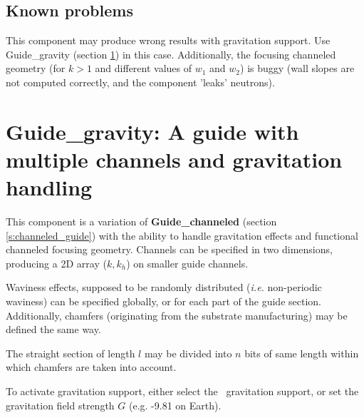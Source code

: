\subsection{Known problems}
This component may produce wrong results with gravitation support. Use Guide\_gravity (section \ref{s:guide_gravity}) in this case. 
Additionally, the focusing channeled geometry (for $k > 1$ and different
values of $w_1$ and $w_2$) is buggy 
(wall slopes are not computed correctly, and the component 'leaks' neutrons).

\newpage

\section{Guide\_gravity: A guide with multiple channels and gravitation handling}
\label{s:guide_gravity}


This component is a variation of {\bf Guide\_channeled} 
(section \ref{s:channeled_guide}) with the ability to handle 
gravitation effects and functional channeled focusing geometry. 
Channels can be specified in two dimensions, 
producing a 2D array ($k, k_h$) on smaller guide channels.

Waviness effects, supposed to be randomly distributed 
(\emph{i.e.} non-periodic waviness) 
can be specified globally, or for each part of the guide section. 
Additionally, chamfers (originating from the substrate manufacturing) 
may be defined the same way.

The straight section of length $l$ may be divided into $n$ bits of same length 
within which chamfers are taken into account.

To activate gravitation support, either select the \MCS\ gravitation support, 
or set the gravitation field strength $G$ (e.g. -9.81 on Earth).


